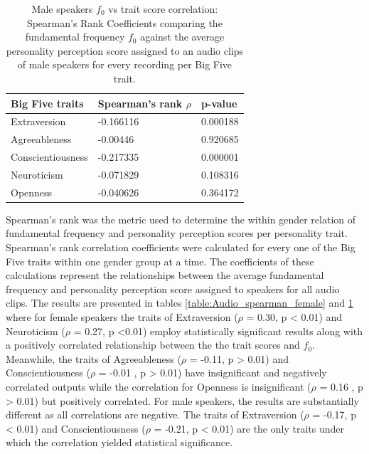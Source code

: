 \documentclass{l4proj}
\begin{document}
\begin{table}[h]
\centering
{}
\begin{tabular}{lll}
\textbf{Big Five traits} & \textbf{Spearman's rank $\rho$} & \textbf{p-value} \\ \hline%
Extraversion             & -0.166116                     & 0.000188         \\
Agreeableness            & -0.00446                    & 0.920685         \\
Conscientiousness        & -0.217335                    & 0.000001         \\
Neuroticism              & -0.071829                     & 0.108316         \\
Openness                 & -0.040626                     & 0.364172         \\ 
\end{tabular}
\vspace{10px}
\caption{Male speakers $f_0$ vs trait score correlation: Spearman's Rank Coefficients comparing the fundamental frequency $f_0$ against the average personality perception score assigned to an audio clips of male speakers for every recording per Big Five trait.}
\label{table:Audio_spearman_male}
\end{table}

Spearman’s rank was the metric used to determine the within gender relation of fundamental frequency and personality perception scores per personality trait. Spearman’s rank correlation coefficients were calculated for every one of the Big Five traits within one gender group at a time. The coefficients of these calculations represent the relationships between the average fundamental frequency and personality perception score assigned to speakers for all audio clips. The results are presented in tables \ref{table:Audio_spearman_female} and \ref{table:Audio_spearman_male} where for female speakers the traits of Extraversion ($\rho$ = 0.30, p < 0.01) and Neuroticism ($\rho$ = 0.27, p <0.01) employ statistically significant results along with a positively correlated relationship between the the trait scores and $f_0$. Meanwhile, the traits of Agreeableness ($\rho$ = -0.11, p > 0.01) and Conscientiousness ($\rho$ = -0.01 , p > 0.01) have insignificant and negatively correlated outputs while the correlation for Openness is insignificant ($\rho$ = 0.16 , p > 0.01) but positively correlated. For male speakers, the results are substantially different as all correlations are negative. The traits of Extraversion ($\rho$ = -0.17, p < 0.01) and Conscientiousness ($\rho$ = -0.21, p < 0.01) are the only traits under which the correlation yielded statistical significance.
\end{document}
